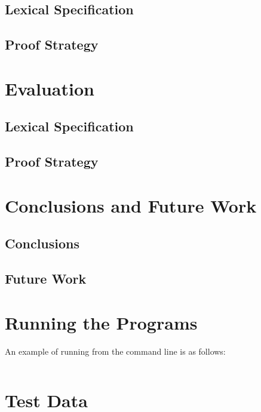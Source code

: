 \documentclass{l4proj}
\begin{document}
\section{Lexical Specification}

\section{Proof Strategy}

\chapter{Evaluation}

\section{Lexical Specification}

\section{Proof Strategy}

\chapter{Conclusions and Future Work}

\section{Conclusions}

\section{Future Work}


\begin{appendices}

\chapter{Running the Programs}
An example of running from the command line is as follows:
\begin{verbatim}
\end{verbatim}

\chapter{Test Data}

\end{appendices}




\end{document}
